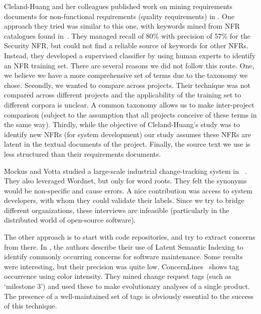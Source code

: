 \documentclass{acm_proc_article-sp}
\begin{document}
Cleland-Huang and her colleagues published work on mining requirements documents for non-functional requirements (quality requirements) in \cite{Cleland-Huang2006}. One approach they tried was similar to this one, with keywords mined from NFR catalogues found in~\cite{chung99}. They managed recall of 80\% with precision of 57\% for the Security NFR, but could not find a reliable source of keywords for other NFRs. Instead, they developed a supervised classifier by using human experts to identify an NFR training set. There are several reasons we did not follow this route. One, we believe we have a more comprehensive set of terms due to the taxonomy we chose. Secondly, we wanted to compare across projects. Their technique was not compared across different projects and the applicability of the training set to different corpora is unclear. A common taxonomy allows us to make inter-project comparison (subject to the assumption that all projects conceive of these terms in the same way). Thirdly, while the objective of Cleland-Huang's study was to identify new NFRs (for system development) our study assumes these NFRs are latent in the textual documents of the project. Finally, the source text we use is less structured than their requirements documents.

Mockus and Votta studied a large-scale industrial change-tracking system in ~\cite{Mockus00}. They also leveraged Wordnet, but only for word roots. They felt the synonyms would be non-specific and cause errors. A nice contribution was access to system developers, with whom they could validate their labels. Since we try to bridge different organizations, these interviews are infeasible (particularly in the distributed world of open-source software).

The other approach is to start with code repositories, and try to extract concerns from there. In \cite{marcus04wcre}, the authors describe their use of Latent Semantic Indexing to identify commonly occurring concerns for software maintenance. Some results were interesting, but their precision was quite low. ConcernLines~\cite{treude09cl} shows tag occurrence using color intensity. They mined change request tags (such as `milestone 3') and used these to make evolutionary analyses of a single product. The presence of a well-maintained set of tags is obviously essential to the success of this technique.
\end{document}
